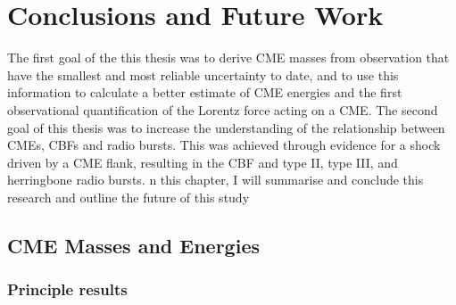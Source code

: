 
\singlespacing
\chapter{Conclusions and Future Work} 

\label{chap:6}

\doublespacing
The first goal of the this thesis was to derive CME masses from observation that have the smallest and most reliable uncertainty to date, and to use this information to calculate a better estimate of CME energies and the first observational quantification of the Lorentz force acting on a CME.
The second goal of this thesis was to increase the understanding of the relationship between CMEs, CBFs and radio bursts. This was achieved through evidence for a shock driven by a CME flank, resulting in the CBF and type II, type III, and herringbone radio bursts. n this chapter, I will summarise and conclude this research and outline the future of this study
\clearpage

\section{CME Masses and Energies}

\subsection{Principle results}

